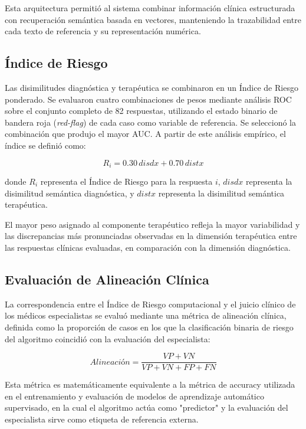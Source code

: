 \documentclass[final,11pt,3p]{elsarticle}
\begin{document}
Esta arquitectura permitió al sistema combinar información clínica estructurada con recuperación semántica basada en vectores, manteniendo la trazabilidad entre cada texto de referencia y su representación numérica.

\subsection{Índice de Riesgo}
\label{S:2.8}

Las disimilitudes diagnóstica y terapéutica se combinaron en un Índice de Riesgo ponderado. Se evaluaron cuatro combinaciones de pesos mediante análisis ROC sobre el conjunto completo de 82 respuestas, utilizando el estado binario de bandera roja (\textit{red-flag}) de cada caso como variable de referencia. Se seleccionó la combinación que produjo el mayor AUC. A partir de este análisis empírico, el índice se definió como:

\begin{equation}
R_i = 0.30\,disdx + 0.70\,distx
\label{eq:risk-index}
\end{equation}

donde $R_i$ representa el Índice de Riesgo para la respuesta $i$, $disdx$ representa la disimilitud semántica diagnóstica, y $distx$ representa la disimilitud semántica terapéutica.

El mayor peso asignado al componente terapéutico refleja la mayor variabilidad y las discrepancias más pronunciadas observadas en la dimensión terapéutica entre las respuestas clínicas evaluadas, en comparación con la dimensión diagnóstica.

\subsection{Evaluación de Alineación Clínica}
\label{S:2.9}

La correspondencia entre el Índice de Riesgo computacional y el juicio clínico de los médicos especialistas se evaluó mediante una métrica de alineación clínica, definida como la proporción de casos en los que la clasificación binaria de riesgo del algoritmo coincidió con la evaluación del especialista:

\begin{equation}
Alineación =
\frac{VP+VN}{VP+VN+FP+FN}
\label{eq:alignment}
\end{equation}

Esta métrica es matemáticamente equivalente a la métrica de accuracy utilizada en el entrenamiento y evaluación de modelos de aprendizaje automático supervisado, en la cual el algoritmo actúa como "predictor" y la evaluación del especialista sirve como etiqueta de referencia externa.
\end{document}

